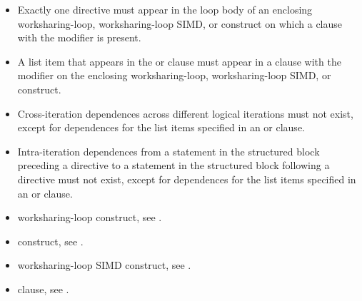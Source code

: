 \begin{itemize}

\item Exactly one  directive must appear in the loop body of an
    enclosing worksharing-loop, worksharing-loop SIMD, or  construct on which a
     clause with the  modifier is present.

\item A list item that appears in the  or 
    clause must appear in a  clause with the 
    modifier on the enclosing worksharing-loop, worksharing-loop SIMD, or  construct.

\item Cross-iteration dependences across different logical iterations must not
    exist, except for dependences for the list items specified in an
     or  clause.

\item Intra-iteration dependences from a statement in the structured block
    preceding a  directive to a statement in the structured block
    following a  directive must not exist, except for dependences
    for the list items specified in an  or 
    clause.

\end{itemize}

\crossreferences
\begin{itemize}
\item worksharing-loop construct, see
.

\item {} construct, see
.

\item worksharing-loop SIMD construct, see
.

\item {} clause, see .
\end{itemize}

